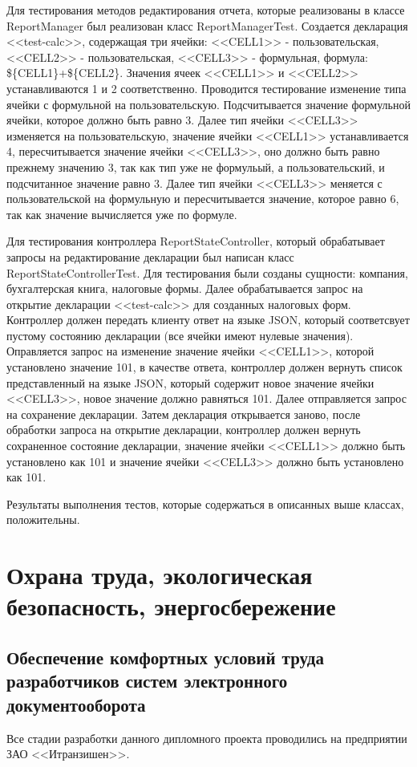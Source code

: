 \documentclass[14pt,a4paper]{reportmod}
\begin{document}
Для тестирования методов редактирования отчета, которые реализованы в классе ReportManager был реализован класс ReportManagerTest. Создается декларация <<test-calc>>, содержащая три ячейки: <<CELL1>> - пользовательская, <<CELL2>> - пользовательская, <<CELL3>> - формульная, формула: \$\{CELL1\}+\$\{CELL2\}. Значения ячеек <<CELL1>> и <<CELL2>> устанавливаются 1 и 2 соответственно. Проводится тестирование изменение типа ячейки с формульной на пользовательскую. Подсчитывается значение формульной ячейки, которое должно быть равно 3. Далее тип ячейки <<CELL3>> изменяется на пользовательскую, значение ячейки <<CELL1>> устанавливается 4, пересчитывается значение ячейки <<CELL3>>, оно должно быть равно прежнему значению 3, так как тип уже не формульый, а пользовательский, и подсчитанное значение равно 3. Далее тип ячейки <<CELL3>> меняется с пользовательской на формульную и пересчитывается значение, которое равно 6, так как значение вычисляется уже по формуле.


Для тестирования контроллера ReportStateController, который обрабатывает запросы на редактирование декларации был написан класс ReportStateControllerTest. Для тестирования были созданы сущности: компания, бухгалтерская книга, налоговые формы. Далее обрабатывается запрос на открытие декларации <<test-calc>> для созданных налоговых форм. Контроллер должен передать клиенту ответ на языке JSON, который соответсвует пустому состоянию декларации (все ячейки имеют нулевые значения). Оправляется запрос на изменение значение ячейки <<CELL1>>, которой установлено значение 101, в качестве ответа, контроллер должен вернуть список представленный на языке JSON, который содержит новое значение ячейки <<CELL3>>, новое значение должно равняться 101. Далее отправляется запрос на сохранение декларации. Затем декларация открывается заново, после обработки запроса на открытие декларации, контроллер должен вернуть сохраненное состояние декларации, значение ячейки <<CELL1>> должно быть установлено как 101 и значение ячейки <<CELL3>> должно быть установлено как 101.


Результаты  выполнения тестов, которые содержаться в описанных выше классах, положительны.

\chapter{Охрана труда, экологическая безопасность, энергосбережение}

\section{Обеспечение комфортных условий труда разработчиков систем электронного документооборота}
Все стадии разработки данного дипломного проекта проводились на предприятии ЗАО <<Итранзишен>>.
\end{document}
